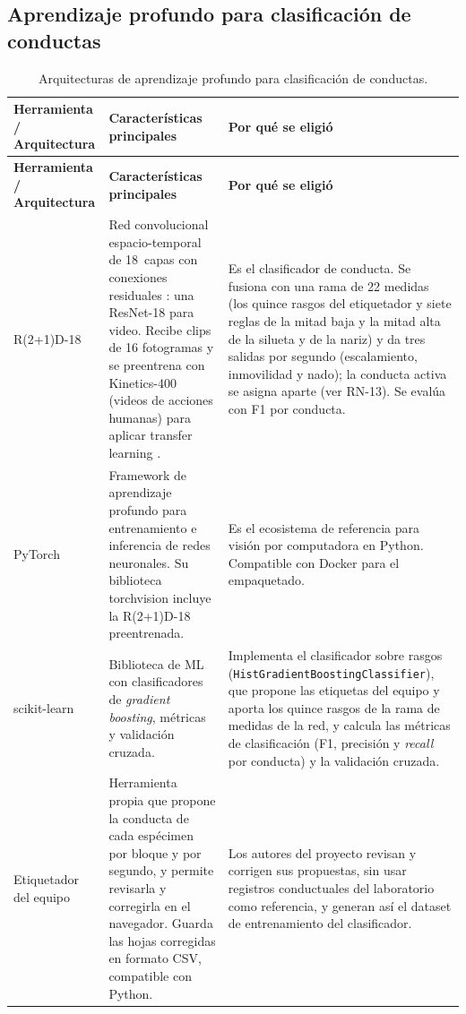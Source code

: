 \subsection{Aprendizaje profundo para clasificación de conductas}

\begin{longtable}{|p{2.7cm}|p{5.2cm}|p{5.2cm}|}
\caption{Arquitecturas de aprendizaje profundo para clasificación de conductas.
\label{tab:herr_dl}}\\
\hline
\textbf{Herramienta / Arquitectura} & \textbf{Características principales} & \textbf{Por qué se eligió} \\
\hline
\endfirsthead
\hline
\textbf{Herramienta / Arquitectura} & \textbf{Características principales} & \textbf{Por qué se eligió} \\
\hline
\endhead
\hline
\endfoot

R(2+1)D-18 \cite{tran2018}
    & Red convolucional espacio-temporal de 18~capas con conexiones residuales
      \cite{he2016}: una ResNet-18 para video. Recibe clips de 16 fotogramas y se
      preentrena con Kinetics-400 (videos de acciones humanas) para aplicar
      transfer learning \cite{pan2010}.
    & Es el clasificador de conducta. Se fusiona con una rama de 22 medidas (los quince
      rasgos del etiquetador y siete reglas de la mitad baja y la mitad alta de la silueta y de la nariz) y da tres salidas por
      segundo (escalamiento, inmovilidad y nado); la conducta activa se asigna aparte
      (ver RN-13). Se evalúa con F1 por conducta. \\
\hline
PyTorch \cite{paszke2019}
    & Framework de aprendizaje profundo para entrenamiento e inferencia de redes
      neuronales. Su biblioteca torchvision incluye la R(2+1)D-18 preentrenada.
    & Es el ecosistema de referencia para visión por computadora en Python.
      Compatible con Docker para el empaquetado. \\
\hline
scikit-learn \cite{pedregosa2011}
    & Biblioteca de ML con clasificadores de \textit{gradient boosting}, métricas y
      validación cruzada.
    & Implementa el clasificador sobre rasgos (\texttt{HistGradient\allowbreak BoostingClassifier}),
      que propone las etiquetas del equipo y aporta los quince rasgos de la rama de
      medidas de la red, y calcula las métricas de
      clasificación (F1, precisión y \textit{recall} por conducta) y la validación
      cruzada. \\
\hline
Etiquetador del equipo
    & Herramienta propia que propone la conducta de cada espécimen por bloque y por
      segundo, y permite revisarla y corregirla en el navegador. Guarda las hojas
      corregidas en formato CSV, compatible con Python.
    & Los autores del proyecto revisan y corrigen sus propuestas, sin usar registros
      conductuales del laboratorio como referencia, y generan así el dataset de
      entrenamiento del clasificador. \\
\hline

\end{longtable}

